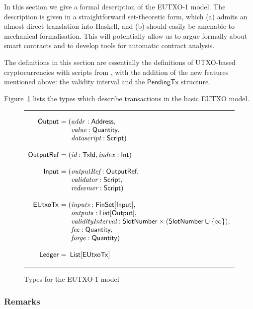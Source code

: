 \documentclass[a4paper]{article}
\renewcommand{\i}{\textit}  %
\newcommand{\s}{\textsf}  %
\newenvironment{arraydefs}[1]{\setlength{\arraycolsep}{0pt}\begin{array}{#1}}{\end{array}}
\newcommand\rfskip{7pt}
\newenvironment{ruledfigure}[1]{\begin{figure}[#1]\hrule\vspace{\rfskip}}{\vspace{\rfskip}\hrule\end{figure}}
\newcommand{\List}[1]{\ensuremath{\s{List}[#1]}}
\newcommand{\FinSet}[1]{\ensuremath{\s{FinSet}[#1]}}
\newcommand{\ptx}{\ensuremath{\s{PendingTx}}}
\newcommand{\mi}[1]{\ensuremath{\mathit{#1}}}
\newcommand{\idx}{\mi{index}}
\newcommand{\inputs}{\mi{inputs}}
\newcommand{\outputs}{\mi{outputs}}
\newcommand{\forge}{\mi{forge}}
\newcommand{\fee}{\mi{fee}}
\newcommand{\addr}{\mi{addr}}
\newcommand{\msf}[1]{\ensuremath{\mathsf{#1}}}
\newcommand{\slotnum}{\msf{SlotNumber}}
\newcommand{\eutxotx}{\msf{EUtxoTx}}
\newcommand{\qty}{\ensuremath{\s{Quantity}}}
\begin{document}
In this section we give a formal description of the EUTXO-1 model.  The
description is given in a straightforward set-theoretic form, which
(a) admits an almost direct translation into Haskell, and (b) should
easily be amenable to mechanical formalisation.  This will potentially
allow us to argue formally about smart contracts and to develop tools
for automatic contract analysis.

The definitions in this section are essentially the definitions of
UTXO-based cryptocurrencies with scripts from
\citep{Zahnentferner18-UTxO}, with the addition of the new features
mentioned above: the validity interval and the $\ptx$ structure.

Figure~\ref{fig:eutxo-1-types} lists the types which
describe transactions in the basic EUTXO model.
\begin{ruledfigure}{H}
  \[
  \begin{arraydefs}{rll}
    
    \s{Output } &= (&\addr: \s{Address},\\
    && \i{value}: \qty,\\
    &&  \i{datascript}: \s{Script})\\
    \\
    \s{OutputRef } &= (&\i{id}: \s{TxId}, \idx: \s{Int})\\
    \\
    \s{Input } & = (&\i{outputRef}: \s{OutputRef},\\
                 && \i{validator}: \s{Script},\\
                 && \i{redeemer}: \s{Script})\\
     \\
     \eutxotx\s{ } &= (&\inputs: \FinSet{\s{Input}},\\
     &&\outputs: \List{\s{Output}},\\
     &&\i{validityInterval}: \slotnum \times (\slotnum \cup \{\infty\}),\\
     && \fee: \qty,\\
     &&\forge: \qty) \\
     \\
     \s{Ledger } &=&\!\List{\eutxotx}\\
  \end{arraydefs}
  \]
  \caption{Types for the EUTXO-1 model}
  \label{fig:eutxo-1-types}
\end{ruledfigure}

\subsubsection{Remarks}
\end{document}
